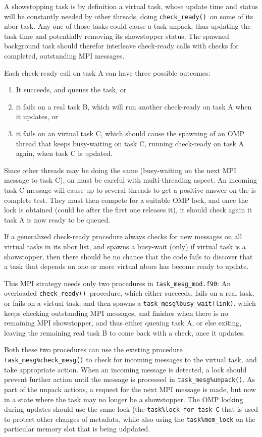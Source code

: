\documentclass[paper=a4,fontsize=11pt]{scrartcl}
\numberwithin{equation}{section}		%
\numberwithin{figure}{section}			%
\numberwithin{table}{section}				%
\newcommand{\codecolor}{\color{Blue}}
\newcommand{\filecolor}{\color{NavyBlue}}
\newcommand{\File}[1]{{\filecolor\texttt{#1}}}
\newcommand{\Code}[1]{{\codecolor\texttt{#1}}}
\def\checkready{\Code{check\_ready()}}
\begin{document}
A showstopping task is by definition a virtual task, whose update time and status will be constantly needed by other threads, doing \checkready\ on some of its nbor task.  Any one of those tasks could cause a task-unpack, thus updating the task time and potentially removing its showstopper status.   The spawned background task should therefor interleave check-ready calls with checks for completed, outstanding MPI messages.

Each check-ready call on task A can have three possible outcomes:
\begin{enumerate}
    \item It succeeds, and queues the task, or
    \item it fails on a real task B, which will run another check-ready on task A when it updates, or
    \item it fails on an virtual task C, which should cause the spawning of an OMP thread that keeps busy-waiting on task C, running check-ready on task A again, when task C is updated.
\end{enumerate}
Since other threads may be doing the same (busy-waiting on the next MPI message to task C), on must be careful with multi-threading aspect.  An incoming task C message will cause up to several threads to get a positive answer on the is-complete test. They must then compete for a suitable OMP lock, and once the lock is obtained (could be after the first one releases it), it should check again it task A is now ready to be queued.

If a generalized check-ready procedure always checks for new messages on all virtual tasks in its nbor list, and spawns a busy-wait (only) if virtual task is a showstopper, then there should be no chance that the code fails to discover that a task that depends on one or more virtual nbors has become ready to update.

This MPI strategy needs only two procedures in \File{task\_mesg\_mod.f90}:  An overloaded \checkready\ procedure, which either succeeds, fails on a real task, or fails on a virtual task, and then spawns a \Code{task\_mesg\%busy\_wait(link)}, which keeps checking outstanding MPI messages, and finishes when there is no remaining MPI showstopper, and thus either queuing task A, or else exiting, leaving the remaining real task B to come back with a check, once it updates.

Both these two procedures can use the existing procedure \Code{task\_mesg\%check\_mesg()} to check for incoming messages to the virtual task, and take appropriate action.  When an incoming message is detected, a lock should prevent further action until the message is processed in \Code{task\_mesg\%unpack()}.  As part of the unpack actions, a request for the next MPI message is made, but now in a state where the task may no longer be a showstopper.  The OMP locking during updates should use the same lock (the \Code{task\%lock for task C} that is used to protect other changes of metadata, while also using the \Code{task\%mem\_lock} on the particular memory slot that is being udpdated.
\end{document}
